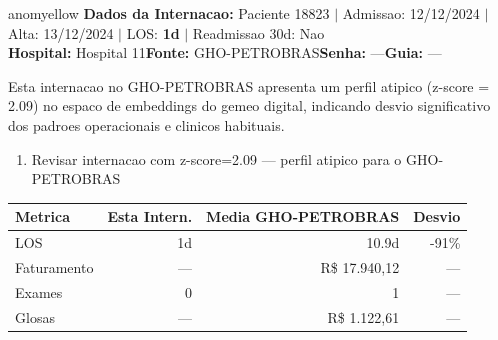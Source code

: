 \documentclass[a4paper,10pt]{article}
\begin{document}
\begin{anomalycard}[Internacao 114964 | GHO-PETROBRAS | MODERADO (z=2.09)]{anomyellow}
\textbf{Dados da Internacao:} Paciente 18823 $\mid$ Admissao: 12/12/2024 $\mid$ Alta: 13/12/2024 $\mid$ LOS: \textbf{1d} $\mid$ Readmissao 30d: Nao\\
\textbf{Hospital:} Hospital 11\quad\textbf{Fonte:} GHO-PETROBRAS\quad\textbf{Senha:} ---\quad\textbf{Guia:} ---\\
\vspace{2pt}\begin{tcolorbox}[colback=severityred!20,colframe=anomyellow,title={\textbf{Interpretacao de Negocio}},fonttitle=\bfseries\small,left=4pt,right=4pt,top=3pt,bottom=3pt]
{\small Esta internacao no GHO-PETROBRAS apresenta um perfil atipico (z-score = 2.09) no espaco de embeddings do gemeo digital, indicando desvio significativo dos padroes operacionais e clinicos habituais.}
\end{tcolorbox}
\begin{tcolorbox}[colback=severityyellow!30,colframe=anomorange,title={\textbf{Recomendacoes Especificas}},fonttitle=\bfseries\small,left=4pt,right=4pt,top=3pt,bottom=3pt]
\begin{enumerate}[nosep,leftmargin=16pt]
\item {\small Revisar internacao com z-score=2.09 --- perfil atipico para o GHO-PETROBRAS}
\end{enumerate}
\end{tcolorbox}
\begin{center}\begin{tabular}{l r r r}\toprule\textbf{Metrica} & \textbf{Esta Intern.} & \textbf{Media GHO-PETROBRAS} & \textbf{Desvio} \\\midrule
LOS & 1d & 10.9d & -91\% \\
Faturamento & --- & R\$ 17.940,12 & --- \\
Exames & 0 & 1 & --- \\
Glosas & --- & R\$ 1.122,61 & --- \\
\bottomrule\end{tabular}\end{center}


\end{anomalycard}
\end{document}
